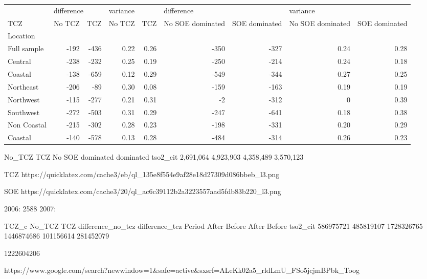\begin{tabular}{lrrrrrrrr}
\toprule
{} & \multicolumn{2}{l}{difference} & \multicolumn{2}{l}{variance} & \multicolumn{2}{l}{difference} & \multicolumn{2}{l}{variance} \\
TCZ &     No TCZ &     TCZ &   No TCZ &  TCZ & No SOE dominated & SOE dominated & No SOE dominated & SOE dominated \\
Location    &            &         &          &      &                  &               &                  &               \\
\midrule
Full sample &    -192 & -436 &     0.22 & 0.26 &          -350 &       -327 &             0.24 &          0.28 \\
Central     &    -238 & -232 &     0.25 & 0.19 &          -250 &       -214 &             0.24 &          0.18 \\
Coastal     &    -138 & -659 &     0.12 & 0.29 &          -549 &       -344 &             0.27 &          0.25 \\
Northeast   &    -206 &  -89 &     0.30 & 0.08 &          -159 &       -163 &             0.19 &          0.19 \\
Northwest   &    -115 & -277 &     0.21 & 0.31 &            -2 &       -312 &             0 &          0.39 \\
Southwest   &    -272 & -503 &     0.31 & 0.29 &          -247 &       -641 &             0.18 &          0.38 \\
Non Coastal &    -215 & -302 &     0.28 & 0.23 &          -198 &       -331 &             0.20 &          0.29 \\
Coastal     &    -140 & -578 &     0.13 & 0.28 &          -484 &       -314 &             0.26 &          0.23 \\
\bottomrule
\end{tabular}


	         No_TCZ	  TCZ	            No SOE dominated               dominated	     
tso2_cit	2,691,064	4,923,903	4,358,489	3,570,123

TCZ
https://quicklatex.com/cache3/eb/ql_135e8f554e9af28e18d27309d086bbeb_l3.png

SOE
https://quicklatex.com/cache3/20/ql_ac6c39112b2a3223557aad5fdb83b220_l3.png


2006: 2588 
2007: 

TCZ_c	No_TCZ	TCZ	difference_no_tcz	difference_tcz
Period	After	Before	After	Before		
tso2_cit	586975721	485819107	1728326765	1446874686	101156614	281452079

1222604206

https://www.google.com/search?newwindow=1&safe=active&sxsrf=ALeKk02a5_rldLmU_FSo5jcjmBPbk_Toog%